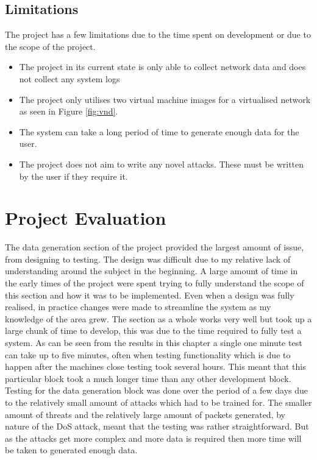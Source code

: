 \subsection{Limitations}
The project has a few limitations due to the time spent on development or due to the scope of the project.
\begin{itemize}
    \item The project in its current state is only able to collect network data and does not collect any system logs
    \item The project only utilises two virtual machine images for a virtualised network as seen in Figure \ref{fig:vnd}.
    \item The system can take a long period of time to generate enough data for the user.
    \item The project does not aim to write any novel attacks. These must be written by the user if they require it.
\end{itemize}
\section{Project Evaluation}
The data generation section of the project provided the largest amount of issue, from designing to testing. The design was difficult due to my relative lack of understanding around the subject in the beginning. A large amount of time in the early times of the project were spent trying to fully understand the scope of this section and how it was to be implemented. Even when a design was fully realised, in practice changes were made to streamline the system as my knowledge of the area grew. The section as a whole works very well but took up a large chunk of time to develop, this was due to the time required to fully test a system. As can be seen from the results in this chapter a single one minute test can take up to five minutes, often when testing functionality which is due to happen after the machines close testing took several hours. This meant that this particular block took a much longer time than any other development block. Testing for the data generation block was done over the period of a few days due to the relatively small amount of attacks which had to be trained for. The smaller amount of threats and the relatively large amount of packets generated, by nature of the DoS attack, meant that the testing was rather straightforward. But as the attacks get more complex and more data is required then more time will be taken to generated enough data.

